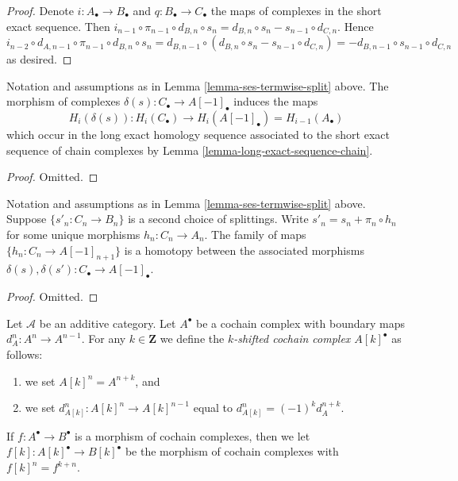 \begin{proof}
Denote $i : A_\bullet \to B_\bullet$ and $q : B_\bullet \to C_\bullet$
the maps of complexes in the short exact sequence. Then
$i_{n - 1} \circ \pi_{n - 1} \circ d_{B, n} \circ s_n =
d_{B, n} \circ s_n - s_{n - 1} \circ d_{C, n}$. Hence
$i_{n - 2} \circ d_{A, n - 1} \circ \pi_{n - 1} \circ d_{B, n} \circ s_n =
d_{B, n - 1} \circ (d_{B, n} \circ s_n - s_{n - 1} \circ d_{C, n}) =
- d_{B, n - 1} \circ s_{n - 1} \circ d_{C, n}$ as desired.
\end{proof}

\begin{lemma}
\label{lemma-ses-termwise-split-long}
Notation and assumptions as in Lemma \ref{lemma-ses-termwise-split} above.
The morphism of complexes $\delta(s) : C_\bullet \to A[-1]_\bullet$
induces the maps
$$
H_i(\delta(s)) :
H_i(C_\bullet) \longrightarrow H_i(A[-1]_\bullet) = H_{i - 1}(A_\bullet)
$$
which occur in the long exact homology sequence associated
to the short exact sequence of chain complexes by
Lemma \ref{lemma-long-exact-sequence-chain}.
\end{lemma}

\begin{proof}
Omitted.
\end{proof}

\begin{lemma}
\label{lemma-ses-termwise-split-homotopy}
Notation and assumptions as in Lemma \ref{lemma-ses-termwise-split} above.
Suppose $\{s'_n : C_n \to B_n\}$ is a second choice of splittings.
Write $s'_n = s_n + \pi_n \circ h_n$ for some unique
morphisms $h_n : C_n \to A_n$. The family of maps
$\{h_n : C_n \to A[-1]_{n + 1}\}$ is a homotopy between
the associated morphisms
$\delta(s), \delta(s') : C_\bullet \to A[-1]_\bullet$.
\end{lemma}

\begin{proof}
Omitted.
\end{proof}



\begin{definition}
\label{definition-shift-cochain}
Let $\mathcal{A}$ be an additive category.
Let $A^\bullet$ be a cochain complex
with boundary maps $d_A^n : A^n \to A^{n - 1}$.
For any $k \in \mathbf{Z}$ we define the
{\it $k$-shifted cochain complex $A[k]^\bullet$}
as follows:
\begin{enumerate}
\item we set $A[k]^n = A^{n + k}$, and
\item we set $d_{A[k]}^n : A[k]^n \to A[k]^{n - 1}$
equal to $d_{A[k]}^n = (-1)^k d_A^{n + k}$.
\end{enumerate}
If $f : A^\bullet \to B^\bullet$ is a morphism of
cochain complexes, then we let
$f[k] : A[k]^\bullet \to B[k]^\bullet$ be the
morphism of cochain complexes with
$f[k]^n = f^{k + n}$.
\end{definition}

